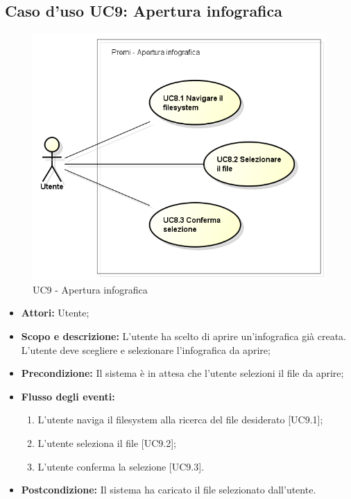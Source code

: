 \subsection{Caso d'uso UC9: Apertura infografica}
\begin{figure}[h] 
	\centering 
	\includegraphics[scale=0.45] {img/UC9.png} 
	\caption{UC9 - Apertura infografica} 
\end{figure}

\begin{itemize}
	\item \textbf{Attori:} Utente;
	\item \textbf{Scopo e descrizione:} L'utente ha scelto di aprire un'\gls{infografica} già creata. L'utente deve scegliere e selezionare l'\gls{infografica} da aprire;
	\item \textbf{Precondizione:} Il sistema è in attesa che l'utente selezioni il file da aprire;
	\item \textbf{Flusso degli eventi:}
	\begin{enumerate}
		\item L'utente naviga il \gls{filesystem} alla ricerca del file desiderato [UC9.1];
		\item L'utente seleziona il file [UC9.2];
		\item L'utente conferma la selezione [UC9.3].
	\end{enumerate}
	\item \textbf{Postcondizione:} Il sistema ha caricato il file selezionato dall'utente.
\end{itemize}

